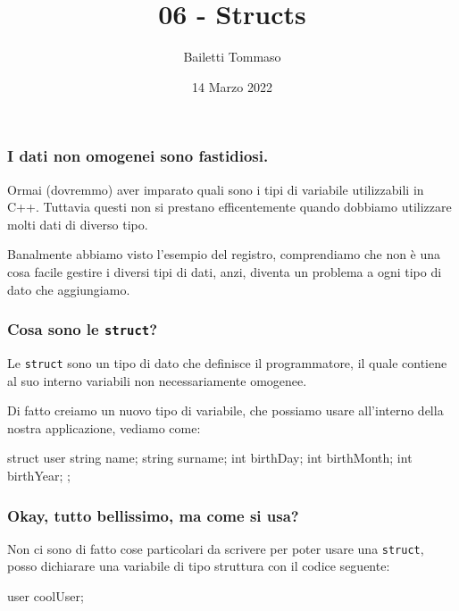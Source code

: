 \documentclass{beamer}
\title{06 - Structs}
\author{Bailetti Tommaso}
\institute{ITI Don Orione}
\date{14 Marzo 2022}
\begin{document}
    \begin{frame}
        \titlepage
    \end{frame}
    
    \begin{frame}
        \frametitle{I dati non omogenei sono fastidiosi.}
    
        Ormai (dovremmo) aver imparato quali sono i tipi di variabile utilizzabili in C++. Tuttavia questi non si prestano efficentemente quando dobbiamo utilizzare molti dati di diverso tipo.

        Banalmente abbiamo visto l'esempio del registro, comprendiamo che non è una cosa facile gestire i diversi tipi di dati, anzi, diventa un problema a ogni tipo di dato che aggiungiamo.
    
    \end{frame}

    \begin{frame}[fragile]
        \frametitle{Cosa sono le \texttt{struct}?}
    
        Le \texttt{struct} sono un tipo di dato che definisce il programmatore, il quale contiene al suo interno variabili non necessariamente omogenee.

        Di fatto creiamo un nuovo tipo di variabile, che possiamo usare all'interno della nostra applicazione, vediamo come:

        \begin{cppcode}
            struct user {
                string name;
                string surname;
                int birthDay;
                int birthMonth;
                int birthYear;
            };
        \end{cppcode}
    
    \end{frame}

    \begin{frame}[fragile]
        \frametitle{Okay, tutto bellissimo, ma come si usa?}
    
        Non ci sono di fatto cose particolari da scrivere per poter usare una \texttt{struct}, posso dichiarare una variabile di tipo struttura con il codice seguente:

        \begin{cppcode}
            user coolUser;
        \end{cppcode}
    
    \end{frame}
\end{document}
